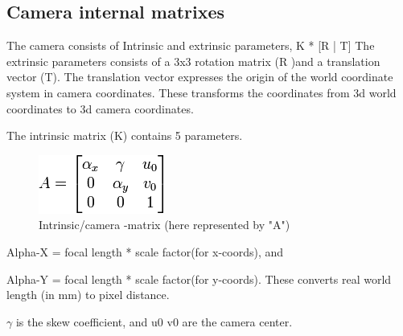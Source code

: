 \subsection{Camera internal matrixes}

The camera consists of Intrinsic and extrinsic parameters,
K * [R | T]
The extrinsic parameters consists of a 3x3 rotation matrix (R )and a
translation vector (T). The translation vector expresses the origin of the world
coordinate system in camera coordinates. 
These transforms the coordinates from 3d world coordinates to 3d camera
coordinates. 

The intrinsic matrix (K) contains 5 parameters.

\begin{figure}[!htbp]
\includegraphics{pics/intristic_parameters.png}
\caption{Intrinsic/camera -matrix (here represented by "A")}
\label{fig:intrinsic_parameters}
\end{figure}

Alpha-X = focal length * scale factor(for x-coords), and 

Alpha-Y = focal length * scale factor(for y-coords). These converts real world
length (in mm) to pixel distance. 

$\gamma$  is the skew coefficient, and u0 v0 are the camera center.
